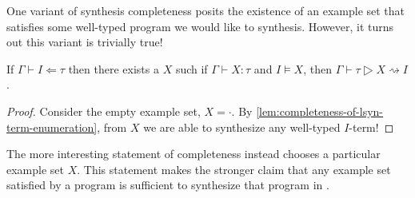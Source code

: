 One variant of synthesis completeness posits the existence of an example set that satisfies some well-typed program we would like to synthesis.
However, it turns out this variant is trivially true!
\begin{proofenv}
  \begin{lemma}
  If $Γ ⊢ I ⇐ τ$ then there exists a $Χ$ such if $Γ ⊢ Χ : τ$ and $I ⊨ Χ$, then $Γ ⊢ τ ▷ Χ ⇝ I$.
  \end{lemma}
  \begin{proof}
    Consider the empty example set, $Χ = ·$.
    By \autoref{lem:completeness-of-lsyn-term-enumeration}, from $Χ$ we are able to synthesize any well-typed $I$-term!
  \end{proof}
\end{proofenv}

The more interesting statement of completeness instead chooses a particular example set $Χ$.
This statement makes the stronger claim that any example set satisfied by a program is sufficient to synthesize that program in \lsyn{}.
